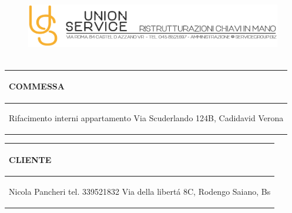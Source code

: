 \documentclass[a4paper]{article}
\begin{document}
\begin{figure}[!t]
\includegraphics[width=15.8cm, height=3cm]{intestazioneAlta2.jpg}
\end{figure}

\noindent\begin{tabular}{| L{72.2mm} |}
    \hline
    \vspace{2.5mm}
    \begin{spacing}{0}
    \textbf{COMMESSA}
    \end{spacing}\\
    \hline
    \vspace{4mm}
    \begin{spacing}{1.2}
    Rifacimento interni appartamento \newline
    Via Scuderlando 124B, Cadidavid \newline
    Verona
    \end{spacing}\\
    \hline
  \end{tabular}
  \quad
  \begin{tabular}{ | R{72.2mm} | }
    \hline
    \vspace{2.5mm}
    \begin{spacing}{0}
    \textbf{CLIENTE}
    \end{spacing}\\
    \hline
    \vspace{4mm}
    \begin{spacing}{1.2}
    Nicola Pancheri \newline
    tel. 339521832 \newline
    Via della libert\'a 8C, Rodengo Saiano, Bs \newline
    \end{spacing}\\
    \hline
  \end{tabular}
\end{document}
